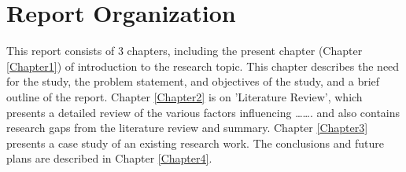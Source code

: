 
\section{Report Organization}
This report consists of 3 chapters, including the present chapter (Chapter \ref{Chapter1}) of introduction to the research topic. This chapter describes the need for the study, the problem statement, and objectives of the study, and a brief outline of the report. Chapter \ref{Chapter2} is on 'Literature Review', which presents a detailed review of the various factors influencing \ldots \ldots. and also contains research gaps from the literature review and summary. Chapter \ref{Chapter3} presents a case study of an existing research work. The conclusions and future plans are described in Chapter \ref{Chapter4}.
